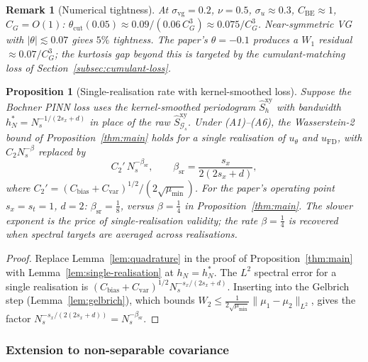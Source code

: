 \documentclass[review,12pt]{elsarticle}
\newtheorem{remark}{Remark}
\newtheorem{proposition}{Proposition}
\begin{document}
\begin{remark}[Numerical tightness]
\label{rem:be-numerical}
At $\sigma_{\mathrm{vg}}=0.2$, $\nu=0.5$, $\sigma_u\approx 0.3$,
$C_{\mathrm{BE}}\approx 1$, $C_G=O(1)$:
$\theta_{\mathrm{cut}}(0.05)
\approx 0.09/(0.06\,C_G^3)
\approx 0.075/C_G^3$.
Near-symmetric VG with $|\theta|\lesssim 0.07$ gives $5\%$ tightness.
The paper's $\theta=-0.1$ produces a $W_1$ residual $\approx 0.07/C_G^3$;
the kurtosis gap beyond this is targeted by the cumulant-matching loss
of Section~\ref{subsec:cumulant-loss}.
\end{remark}

\begin{proposition}[Single-realisation rate with kernel-smoothed loss]
\label{cor:smoothed-loss}
Suppose the Bochner PINN loss uses the kernel-smoothed periodogram
\(\widehat S^{\mathrm{xy}}_h\) with bandwidth
\(h_N^* = N_s^{-1/(2s_x+d)}\) in place of the raw
\(\widehat S^{\mathrm{xy}}_{\mathcal G_s}\).
Under (A1)--(A6), the Wasserstein-2 bound of
Proposition~\ref{thm:main} holds for a \emph{single realisation}
of \(u_\theta\) and \(u_{\mathrm{FD}}\), with \(C_2 N_s^{-\beta}\)
replaced by
\[
C_2'\,N_s^{-\beta_{\mathrm{sr}}},
\qquad
\beta_{\mathrm{sr}} = \frac{s_x}{2(2s_x + d)},
\]
where
\(C_2' = (C_{\mathrm{bias}}+C_{\mathrm{var}})^{1/2}/(2\sqrt{\mu_{\min}})\).
For the paper's operating point \(s_x = s_t = 1\), \(d = 2\):
\(\beta_{\mathrm{sr}} = \tfrac{1}{8}\), versus \(\beta = \tfrac{1}{4}\)
in Proposition~\ref{thm:main}. The slower exponent is the price of
single-realisation validity; the rate \(\beta = \tfrac{1}{4}\) is
recovered when spectral targets are averaged across realisations.
\end{proposition}
\begin{proof}
Replace Lemma~\ref{lem:quadrature} in the proof of
Proposition~\ref{thm:main} with Lemma~\ref{lem:single-realisation}
at \(h_N = h_N^*\). The \(L^2\) spectral error for a single
realisation is
\((C_{\mathrm{bias}}+C_{\mathrm{var}})^{1/2} N_s^{-s_x/(2s_x+d)}\).
Inserting into the Gelbrich step (Lemma~\ref{lem:gelbrich}), which
bounds \(W_2 \le \tfrac{1}{2\sqrt{\mu_{\min}}}
\|\mu_1 - \mu_2\|_{L^2}\), gives the factor
\(N_s^{-s_x/(2(2s_x+d))} = N_s^{-\beta_{\mathrm{sr}}}\).
\end{proof}

\subsubsection{Extension to non-separable covariance}
\label{subsec:nonsep-extension}
\end{document}
